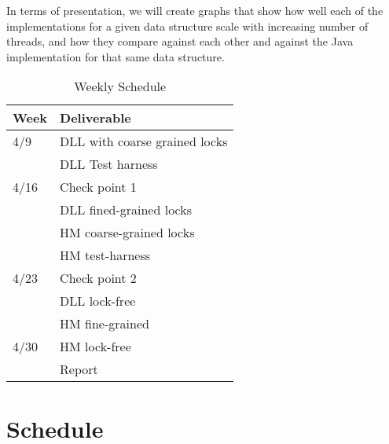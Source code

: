 \documentclass[11pt]{article}
\begin{document}
In terms of presentation, we will create graphs that show how well each of the
implementations for a given data structure scale with increasing number of
threads, and how they compare against each other and against the Java
implementation for that same data structure.

\begin{table}[t]
\begin{center}
\begin{tabular}{ll}
\toprule
\bf Week & \bf Deliverable   \\
\midrule
4/9      & DLL with coarse grained locks \\
         & DLL Test harness \\
4/16     & Check point 1 \\
         & DLL fined-grained locks \\
         & HM coarse-grained locks \\
         & HM test-harness \\
4/23     & Check point 2 \\
         & DLL lock-free \\
         & HM fine-grained \\
4/30     & HM lock-free \\
         & Report \\
\bottomrule
\end{tabular}
\caption{Weekly Schedule}
\label{table:shedule}
\end{center}
\end{table}

\section*{Schedule}

\printbibliography
\end{document}
